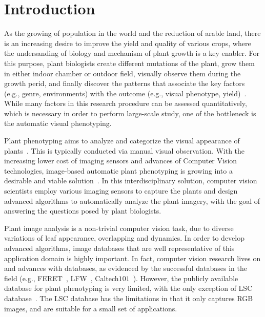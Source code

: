 \section{Introduction}
\label{sec:intro}

As the growing of population in the world and the reduction of arable land, there is an increasing desire to improve the yield and quality of various crops, where the undersanding of biology and mechanism of plant growth is a key enabler.
For this purpose, plant biologists create different mutations of the plant, grow them in either indoor chamber or outdoor field, visually observe them during the growth perid, and finally discover the patterns that associate the   key factors (e.g., genre, environments) with the outcome (e.g., visual phenotype, yield)~\cite{}.
While many factors in this research procedure can be assessed quantitatively, which is necessary in order to perform large-scale study, one of the bottleneck is the automatic visual phenotyping.

Plant phenotyping aims to analyze and categorize the visual appearance of plants~\cite{}.
This is typically conducted via manual visual observation.
With the increasing lower cost of imaging sensors and advances of Computer Vision technologies, image-based automatic plant phenotyping is growing into a desirable and viable solution~\cite{}.
In this interdisciplinary solution, computer vision scientists employ various imaging sensors to capture the plants and design advanced algorithms to automatically analyze the plant imagery, with the goal of answering the questions posed by plant biologists.

Plant image analysis is a non-trivial computer vision task, due to diverse variations of leaf appearance, overlapping and dynamics.
In order to develop advanced algorithms, image databases that are well representative of this application domain is highly important.
In fact, computer vision research lives on and advances with databases, as evidenced by the successful databases in the field (e.g., FERET~\cite{Phillips2000}, LFW~\cite{LFW}, Caltech$101$~\cite{Fei-Fei2004}).
However, the publicly available database for plant phenotyping is very limited, with the only exception of LSC database~\cite{scharr2014annotated}.
The LSC database has the limitations in that it only captures RGB images, and are suitable for a small set of applications.

